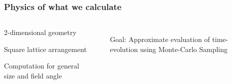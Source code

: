 \begin{frame}
    \frametitle{Physics of what we calculate}

    \begin{columns}
            \begin{wideitemize}
                \item 2-dimensional geometry
                \item Square lattice arrangement
                \item Computation for general size and field angle
            \end{wideitemize}
            
            \vspace{0.5cm}
            \begin{itemize}
                \item[Goal:]
                Approximate evaluation of time-evolution using Monte-Carlo Sampling
            \end{itemize}

            
    \end{columns}

    \onslide %
\end{frame}

